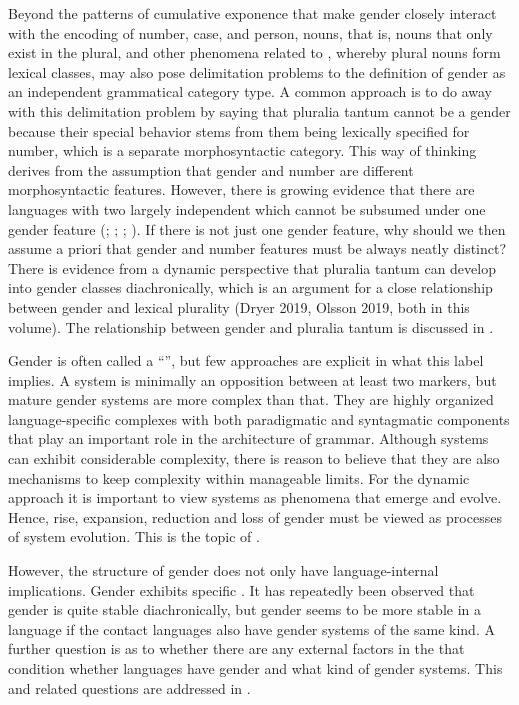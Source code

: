 \documentclass[output=collectionpaper]{langsci/langscibook}
\begin{document}
Beyond the patterns of cumulative exponence that make gender closely interact with the encoding of number, case, and person,  nouns, that is, nouns that only exist in the plural, and other phenomena related to , whereby plural nouns form lexical classes, may also pose delimitation problems to the definition of gender as an independent grammatical category type. A common approach is to do away with this delimitation problem by saying that pluralia tantum cannot be a gender because their special behavior stems from them being lexically specified for number, which is a separate morphosyntactic category. This way of thinking derives from the assumption that gender and number are different morphosyntactic features. However, there is growing evidence that there are languages with two largely independent  which cannot be subsumed under one gender feature (\citealt{Fedden2017}; \citealt{Corbett2017}; ; ). If there is not just one gender feature, why should we then assume a priori that gender and number features must be always neatly distinct? There is evidence from a dynamic perspective that pluralia tantum can develop into gender classes diachronically, which is an argument for a close relationship between gender and lexical plurality (Dryer 2019, Olsson 2019, both in this volume). The relationship between gender and pluralia tantum is discussed in .

Gender is often called a ``'', but few approaches are explicit in what this label implies. A system is minimally an opposition between at least two markers, but mature gender systems are more complex than that. They are highly organized language-specific complexes with both paradigmatic and syntagmatic components that play an important role in the architecture of grammar. Although systems can exhibit considerable complexity, there is reason to believe that they are also mechanisms to keep complexity within manageable limits. For the dynamic approach it is important to view systems as phenomena that emerge and evolve. Hence, rise, expansion, reduction and loss of gender must be viewed as processes of system evolution. This is the topic of .

However, the structure of gender does not only have language-internal implications. Gender exhibits specific . It has repeatedly been observed that gender is quite stable diachronically, but gender seems to be more stable in a language if the contact languages also have gender systems of the same kind. A further question is as to whether there are any external factors in the  that condition whether languages have gender and what kind of gender systems. This and related questions are addressed in .
\end{document}

